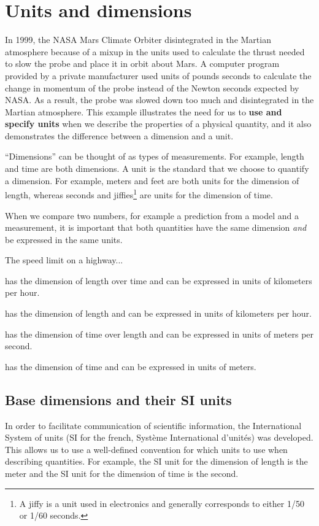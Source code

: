 \section{Units and dimensions}
In 1999, the NASA Mars Climate Orbiter disintegrated in the Martian atmosphere because of a mixup in the units used to calculate the thrust needed to slow the probe and place it in orbit about Mars. A computer program provided by a private manufacturer used units of pounds seconds to calculate the change in momentum of the probe instead of the Newton seconds expected by NASA. As a result, the probe was slowed down too much and disintegrated in the Martian atmosphere. This example illustrates the need for us to \textbf{use and specify units} when we describe the properties of a physical quantity, and it also demonstrates the difference between a dimension and a unit.

``Dimensions'' can be thought of as types of measurements. For example, length and time are both dimensions. A unit is the standard that we choose to quantify a dimension. For example, meters and feet are both units for the dimension of length, whereas seconds and jiffies\footnote{A jiffy is a unit used in electronics and generally corresponds to either 1/50 or 1/60 seconds.} are units for the dimension of time.

When we compare two numbers, for example a prediction from a model and a measurement, it is important that both quantities have the same dimension \textit{and} be expressed in the same units.
\begin{checkpoint}
\begin{MCquestion}{The speed limit on a highway...}
\item has the dimension of length over time and can be expressed in units of kilometers per hour. \correct
\item has the dimension of length and can be expressed in units of kilometers per hour.
\item has the dimension of time over length and can be expressed in units of meters per second.
\item has the dimension of time and can be expressed in units of meters.
\end{MCquestion}
\end{checkpoint}

\subsection{Base dimensions and their SI units}
In order to facilitate communication of scientific information, the International System of units (SI for the french, Syst\`eme International d'unit\'es) was developed. This allows us to use a well-defined convention for which units to use when describing quantities. For example, the SI unit for the dimension of length is the meter and the SI unit for the dimension of time is the second.

